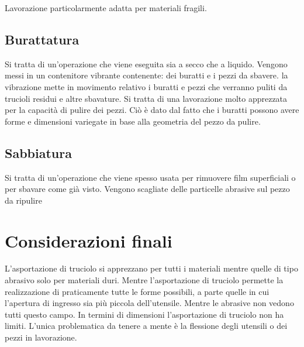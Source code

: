 
Lavorazione particolarmente adatta per materiali fragili.

\subsection{Burattatura}
Si tratta di un'operazione che viene eseguita sia a secco che a liquido.
Vengono messi in un contenitore vibrante contenente: dei buratti e i pezzi da sbavere. la vibrazione mette in movimento relativo i buratti e pezzi che verranno puliti da trucioli residui e altre sbavature.
Si tratta di una lavorazione molto apprezzata per la capacità di pulire dei pezzi. Ciò è dato dal fatto che i buratti possono avere forme e dimensioni variegate in base alla geometria del pezzo da pulire.

\subsection{Sabbiatura}
Si tratta di un'operazione che viene spesso usata per rimuovere film superficiali o per sbavare come già visto.
Vengono scagliate delle particelle abrasive sul pezzo da ripulire

\section{Considerazioni finali}
L'asportazione di truciolo si apprezzano per tutti i materiali mentre quelle di tipo abrasivo solo per materiali duri.
Mentre l'asportazione di truciolo permette la realizzazione di praticamente tutte le forme possibili, a parte quelle in cui l'apertura di ingresso sia più piccola dell'utensile. Mentre le abrasive non vedono tutti questo campo.
In termini di dimensioni l'asportazione di truciolo non ha limiti. L'unica problematica da tenere a mente è la flessione degli utensili o dei pezzi in lavorazione.

